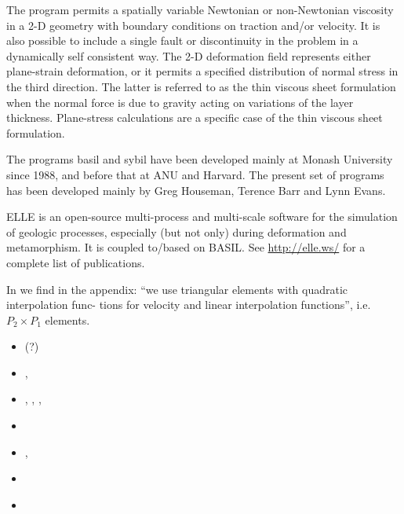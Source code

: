 The program permits a spatially variable Newtonian  or  non-Newtonian  viscosity  in a 2-D 
geometry with boundary conditions on traction and/or velocity.  It is also  possible  
to include  a single fault or discontinuity in the problem in a dynamically self consistent way.  
The 2-D deformation  field represents  either plane-strain deformation, or it permits 
a specified distribution of normal stress in the third  direction.   The  latter is referred 
to as the thin viscous sheet formulation when the normal force is due to  gravity  acting on 
variations of the layer thickness.  Plane-stress calculations are a specific case of 
the thin viscous sheet formulation.

The programs basil and sybil have been developed  mainly  at Monash  University  since  1988,  
and before that at ANU and Harvard.  The present set of  programs  has  been  developed mainly  by  
Greg  Houseman, Terence  Barr  and  Lynn Evans.

ELLE is an open-source multi-process and multi-scale software for the simulation of geologic processes, 
especially (but not only) during deformation and metamorphism. It is coupled to/based on BASIL. 
See \url{http://elle.ws/} for a complete list of publications.

In \textcite{baho96} we find in the appendix: ``we use triangular elements with quadratic interpolation func-
tions for velocity and linear interpolation functions'', i.e. $P_2 \times P_1$ elements.

\begin{small}
\begin{itemize}
\item[\nineteenninetytwo]    \textcite{baho92}(?)
\item[\nineteenninetysix]    \textcite{baho96},  \textcite{hoen96}
\item[\nineteenninetyseven]  \textcite{hogu97},  \textcite{homo97},
                             \textcite{bobt97},  \textcite{neho97}
\item[\twothousand]          \textcite{honk00}
\item[\twothousandone]       \textcite{tesb01},  \textcite{jebe01}
\item[\twothousandeight]     \textcite{bokj08}
\item[\twothousandnineteen]  \textcite{llor19}
\end{itemize}
\end{small}



